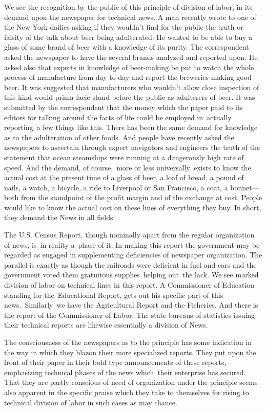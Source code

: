 \documentclass[openany,nobib]{tufte-book}
\begin{document}
We see the recognition by the public of this principle of division of
labor, in its demand upon the newspaper for technical news. A man
recently wrote to one of the New York dailies asking if they wouldn't
find for the public the truth or falsity of the talk about beer being
adulterated. He wanted to be able to buy a glass of some brand of beer
with a knowledge of its purity. The correspondent asked the newspaper to
have the several brands analyzed and reported upon. He asked also that
experts in knowledge of beer-making be put to watch the whole process of
manufacture from day to day and report the breweries making good beer.
It was suggested that manufacturers who wouldn't allow close inspection
of this kind would prima facie stand before the public as adulterers of
beer. It was submitted by the correspondent that the money which the
paper paid to its editors for talking around the facts of life could be
employed in~actually reporting~a few things like this. There has been
the same demand for knowledge as to the adulteration of other foods. And
people have recently asked the newspapers to ascertain through expert
navigators and engineers the truth of the statement that ocean
steamships were running at a dangerously high rate of speed. And the
demand, of course,~more or less universally~exists to know the actual
cost at the present time of a glass of beer, a loaf of bread, a pound of
nails, a watch, a bicycle, a ride to Liverpool or San Francisco, a coat,
a bonnet---both from the standpoint of the profit margin and of the
exchange at cost. People would like to know the actual cost on these
lines of everything they buy. In short, they demand the News in all
fields.~

The U.S. Census Report, though nominally apart from the regular
organization of news, is~in reality a~phase of it. In making this report
the government may be regarded as engaged in supplementing deficiencies
of newspaper organization. The parallel is exactly as though the
railroads were deficient in fuel and cars and the government voted them
gratuitous supplies~helping out~the lack. We see marked division of
labor on technical lines in this report. A Commissioner of Education
standing for the~Educational Report, gets out his specific part of this
news.~Similarly~we have the Agricultural Report and the Fisheries. And
there is the report of the Commissioner of Labor. The state bureaus of
statistics issuing their technical reports are likewise essentially a
division of News.~

The consciousness of the newspapers as to the principle has some
indication in the way in which they blazon their more specialized
reports. They put upon the front of their paper in their bold type
announcements of these reports, emphasizing technical phases of the news
which~their enterprise has secured. That they are partly conscious of
need of organization under the principle seems also apparent in the
specific praise which they take to themselves for rising to technical
division of labor in such cases as may chance.~
\end{document}
